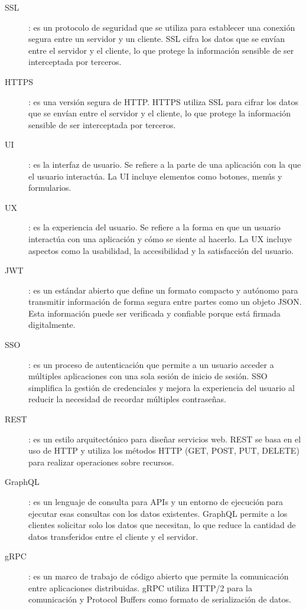 \begin{description}
    \item [\hypertarget{ssl}{SSL}]: es un protocolo de seguridad que se utiliza para establecer una conexión segura entre un servidor y un cliente. SSL cifra los datos que se envían entre el servidor y el cliente, lo que protege la información sensible de ser interceptada por terceros.
    \item [\hypertarget{https}{HTTPS}]: es una versión segura de HTTP. HTTPS utiliza SSL para cifrar los datos que se envían entre el servidor y el cliente, lo que protege la información sensible de ser interceptada por terceros.
    \item [\hypertarget{ui}{UI}]: es la interfaz de usuario. Se refiere a la parte de una aplicación con la que el usuario interactúa. La UI incluye elementos como botones, menús y formularios.
    \item [\hypertarget{ux}{UX}]: es la experiencia del usuario. Se refiere a la forma en que un usuario interactúa con una aplicación y cómo se siente al hacerlo. La UX incluye aspectos como la usabilidad, la accesibilidad y la satisfacción del usuario.
    \item [\hypertarget{jwt}{JWT}]: es un estándar abierto que define un formato compacto y autónomo para transmitir información de forma segura entre partes como un objeto JSON. Esta información puede ser verificada y confiable porque está firmada digitalmente.
    \item [\hypertarget{sso}{SSO}]: es un proceso de autenticación que permite a un usuario acceder a múltiples aplicaciones con una sola sesión de inicio de sesión. SSO simplifica la gestión de credenciales y mejora la experiencia del usuario al reducir la necesidad de recordar múltiples contraseñas.
    \item [\hypertarget{rest}{REST}]: es un estilo arquitectónico para diseñar servicios web. REST se basa en el uso de HTTP y utiliza los métodos HTTP (GET, POST, PUT, DELETE) para realizar operaciones sobre recursos.
    \item [\hypertarget{graphql}{GraphQL}]: es un lenguaje de consulta para APIs y un entorno de ejecución para ejecutar esas consultas con los datos existentes. GraphQL permite a los clientes solicitar solo los datos que necesitan, lo que reduce la cantidad de datos transferidos entre el cliente y el servidor.
    \item [\hypertarget{grpc}{gRPC}]: es un marco de trabajo de código abierto que permite la comunicación entre aplicaciones distribuidas. gRPC utiliza HTTP/2 para la comunicación y Protocol Buffers como formato de serialización de datos.

\end{description}

